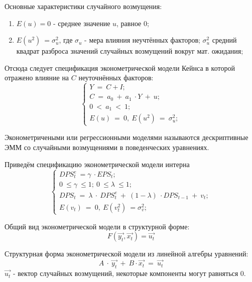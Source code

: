 \documentclass[12pt,a4paper]{article}
\begin{document}
	Основные характеристики случайного возмущения:
\begin{enumerate}
\item $\displaystyle E( u) =0$ - среднее значение $\displaystyle u$, равное 0;
\item $\displaystyle E\left( u^{2}\right) \ =\sigma ^{2}_{u}$, где $\displaystyle \sigma _{u}$ - мера влияния неучтённых факторов; $\displaystyle \sigma ^{2}_{u}$ средний квадрат разброса значений случайных возмущений вокруг мат. ожидания;
\end{enumerate}

	Отсюда следует спецификация эконометрической модели Кейнса в которой отражено влияние на $\displaystyle C$ неуточнённых факторов:
\begin{equation}
\begin{cases}
Y\ =\ C+I;\\
C\ =\ a_{0} \ +\ a_{1} \ \cdot Y\ +\ u;\\
0\ < \ a_{1} \ < \ 1;\\
E( u) \ =\ 0,\ E\left( u^{2}\right) \ =\ \sigma ^{2}_{u};
\end{cases}
\end{equation}

Эконометричеными или регрессионными моделями называются дескриптивные ЭММ со случайными возмущениями в поведенческих уравнениях.

	Приведём спецификацию эконометрической модели интерна
\begin{equation}
\begin{cases}
DPS^{e}_{t} \ =\gamma \ \cdot EPS_{t} ;\\
0\ \leq \gamma \ \leq 1;\ 0\ \leq \lambda \ \leq 1;\\
DPS_{t} \ =\ \lambda \ \cdot \ DPS^{e}_{t} \ +\ ( 1-\lambda ) \ \cdot DPS_{t-1} \ +\ v_{t} ;\\
E( v_{t}) \ =\ 0,\ E\left( v^{2}_{t}\right) \ =\sigma ^{2}_{v} ;\
\end{cases}
\end{equation}

Общий вид эконометрической модели в структурной форме:
\begin{equation}
F\left(\overrightarrow{y_{t}} ,\overrightarrow{x_{t}}\right) =\overrightarrow{u_{t}}
\end{equation}

Структурная форма эконометрической модели из линейной алгебры уравнений:
\begin{equation}
A\ \cdotp \ \overrightarrow{y_{t}} \ +\ B\cdotp \overrightarrow{x_{t}} \ =\ \overrightarrow{u_{t}}
\end{equation}
$\displaystyle \overrightarrow{u_{t}}$ - вектор случайных возмущений, некоторые компоненты могут равняться 0.
\end{document}
